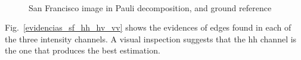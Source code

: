 \documentclass[journal]{IEEEtran}
\begin{document}
\begin{figure}[hbt]
	\centering
	\  
	\caption{San Francisco image in Pauli decomposition, and ground reference}
	\label{roi_gt_SF}
\end{figure}

Fig.~\ref{evidencias_sf_hh_hv_vv} shows the evidences of edges found in each of the three intensity channels.
A visual inspection suggests that the hh channel is the one that produces the best estimation.
\end{document}

